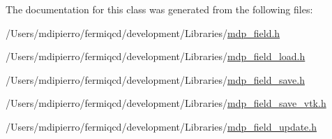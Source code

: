 The documentation for this class was generated from the following files:\begin{DoxyCompactItemize}
\item 
/Users/mdipierro/fermiqcd/development/Libraries/\hyperlink{mdp__field_8h}{mdp\_\-field.h}\item 
/Users/mdipierro/fermiqcd/development/Libraries/\hyperlink{mdp__field__load_8h}{mdp\_\-field\_\-load.h}\item 
/Users/mdipierro/fermiqcd/development/Libraries/\hyperlink{mdp__field__save_8h}{mdp\_\-field\_\-save.h}\item 
/Users/mdipierro/fermiqcd/development/Libraries/\hyperlink{mdp__field__save__vtk_8h}{mdp\_\-field\_\-save\_\-vtk.h}\item 
/Users/mdipierro/fermiqcd/development/Libraries/\hyperlink{mdp__field__update_8h}{mdp\_\-field\_\-update.h}\end{DoxyCompactItemize}
